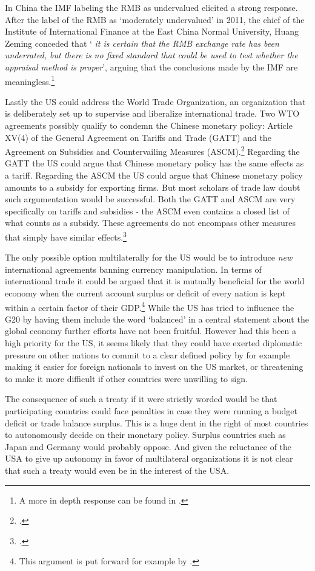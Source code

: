 In China the IMF labeling the RMB as undervalued elicited a strong 
response. After the label of the RMB as `moderately undervalued' in 
2011, the chief of the Institute of International Finance at the East 
China Normal University, Huang Zeming conceded that `\textit{ it is 
	certain that the RMB exchange rate has been underrated, but there is 
	no fixed standard that could be used to test whether the appraisal 
method is proper}', arguing that the conclusions made by the IMF are 
meaningless.\footnote{A more in depth response can be found in 
\cite{ChinaDaily11}.}

Lastly the US could address the World Trade Organization, an organization that is deliberately set up to supervise 
and liberalize international trade. Two WTO agreements possibly qualify to condemn the Chinese monetary policy: Article XV(4) of the General Agreement on Tariffs and Trade (GATT) and the Agreement on Subsidies and Countervailing Measures (ASCM).\footnote{\cite[pp. 135]{Waibel2010}.} Regarding the GATT the US could argue that Chinese monetary policy has the same effects as a tariff. Regarding the ASCM the US could argue that Chinese monetary policy amounts to a subsidy for exporting firms. But most scholars of trade law doubt such argumentation would be successful. Both the GATT and ASCM are very specifically on tariffs and subsidies - the ASCM even contains a closed list of what counts as a subsidy. These agreements  do not encompass other measures that simply have similar effects.\footnote{\cite{Waibel2010}.}

The only possible option multilaterally for the US would be to introduce \emph{new} international agreements banning currency manipulation. In terms of international trade it could be argued that it is mutually 
beneficial for the world economy when the current account surplus or 
deficit of every nation is kept within a certain factor of their 
GDP.\footnote{This argument is put forward for example by
\cite{cline2009}.} While the US has tried to influence the G20 by having 
them include the word `balanced' in a central statement about the global 
economy further efforts have not been fruitful. However had this been a 
high priority for the US, it seems likely that they could have exerted 
diplomatic pressure on other nations to commit to a clear defined policy 
by for example making it easier for foreign nationals to invest on the 
US market, or threatening to make it more difficult if other countries 
were unwilling to sign.

The consequence of such a treaty if it were strictly worded would be 
that participating countries could face penalties in case they were 
running a budget deficit or trade balance surplus.  This is a huge dent 
in the right of most countries to autonomously decide on their monetary 
policy. Surplus countries such as Japan and Germany would probably oppose. And given the reluctance of the USA to give up autonomy in favor of multilateral organizations it is not clear that such a treaty 
would even be in the interest of the USA.


